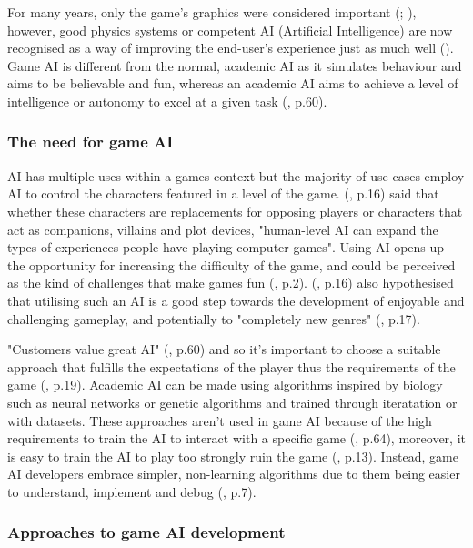 \documentclass[11pt, a4paper]{article}
\begin{document}
For many years, only the game's graphics were considered important (\cite{yap2002grid}; \cite{blow2004game}), however, good physics systems or competent AI (Artificial Intelligence) are now recognised as a way of improving the end-user's experience just as much well (\cite{blow2004game}). Game AI is different from the normal, academic AI as it simulates behaviour and aims to be believable and fun, whereas an academic AI aims to achieve a level of intelligence or autonomy to excel at a given task (\cite{nareyek2004ai}, p.60).

\subsubsection{The need for game AI}

AI has multiple uses within a games context but the majority of use cases employ AI to control the characters featured in a level of the game. \citeauthor{laird2001human} (\citeyear{laird2001human}, p.16) said that whether these characters are replacements for opposing players or characters that act as companions, villains and plot devices, "human-level AI can expand the types of experiences people have playing computer games". Using AI opens up the opportunity for increasing the difficulty of the game, and could be perceived as the kind of challenges that make games fun (\cite{buro2004call}, p.2). \citeauthor{laird2001human} (\citeyear{laird2001human}, p.16) also hypothesised that utilising such an AI is a good step towards the development of enjoyable and challenging gameplay, and potentially to "completely new genres" (\cite{laird2001human}, p.17). 

 "Customers value great AI" (\cite{nareyek2004ai}, p.60) and so it's important to choose a suitable approach that fulfills the expectations of the player thus the requirements of the game (\cite{millington2019ai}, p.19). Academic AI can be made using algorithms inspired by biology such as neural networks or genetic algorithms and trained through iteratation or with datasets. These approaches aren't used in game AI because of the high requirements to train the AI to interact with a specific game (\cite{nareyek2004ai}, p.64), moreover, it is easy to train the AI to play too strongly ruin the game (\cite{tozour2002evolution}, p.13). Instead, game AI developers embrace simpler, non-learning algorithms due to them being easier to understand, implement and debug (\cite{tozour2002evolution}, p.7).

 \subsubsection{Approaches to game AI development}
\end{document}
